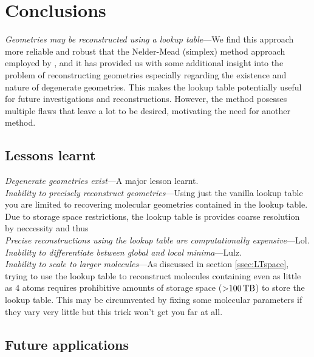 \begin{figure}
  \label{fig:DegenerateGeometryTrajectories}
\end{figure}

\section{Conclusions}
\emph{Geometries may be reconstructed using a lookup table}---We find this approach more reliable and robust that the Nelder-Mead (simplex) method approach employed by \citet{Brichta09}, and it has provided us with some additional insight into the problem of reconstructing geometries especially regarding the existence and nature of degenerate geometries. This makes the lookup table potentially useful for future investigations and reconstructions. However, the method posesses multiple flaws that leave a lot to be desired, motivating the need for another method.

\subsection{Lessons learnt}
\emph{Degenerate geometries exist}---A major lesson learnt. \\

\noindent
\emph{Inability to precisely reconstruct geometries}---Using just the vanilla lookup table you are limited to recovering molecular geometries contained in the lookup table. Due to storage space restrictions, the lookup table is provides coarse resolution by neccessity and thus \\

\noindent
\emph{Precise reconstructions using the lookup table are computationally expensive}---Lol. \\

\noindent
\emph{Inability to differentiate between global and local minima}---Lulz. \\

\noindent
\emph{Inability to scale to larger molecules}---As discussed in section \ref{ssec:LTspace}, trying to use the lookup table to reconstruct molecules containing even as little as 4 atoms requires prohibitive amounts of storage space ($\SI{>100}{\tera\byte}$) to store the lookup table. This may be circumvented by fixing some molecular parameters if they vary very little but this trick won't get you far at all.

\subsection{Future applications}

